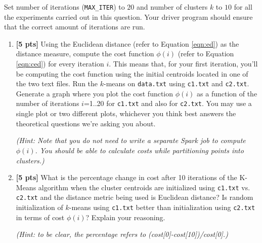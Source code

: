 Set number of iterations (\texttt{MAX\_ITER}) to $20$ and number of clusters
$k$ to $10$ for all the experiments carried out in this question. Your driver
program should ensure that the correct amount of iterations are run.


\begin{enumerate}
\item \textbf{[5 pts] } 
Using the Euclidean distance (refer to Equation \ref{eqn:ed}) as the distance measure, compute the cost function $\phi(i)$ (refer to Equation \ref{eqn:ced}) for every iteration $i$. This means that, for your first iteration, you'll be computing the cost function using the initial centroids located in one of the two text files. Run the $k$-means on \texttt{data.txt} using \texttt{c1.txt} and \texttt{c2.txt}. Generate a graph where you plot the cost function $\phi(i)$ as a function of the number of iterations $i$=1..20 for \texttt{c1.txt} and also for \texttt{c2.txt}. You may use a single plot or two different plots, whichever you think best answers the theoretical questions we’re asking you about.

\textit{(Hint: Note that you do not need to write a separate Spark job to compute $\phi(i)$. You should be able to calculate costs while partitioning points into clusters.)}

\item \textbf{[5 pts] } What is the percentage change in cost after 10 iterations of the K-Means algorithm when the cluster centroids are initialized using \texttt{c1.txt} vs. \texttt{c2.txt} and the distance metric being used is Euclidean distance? Is random initialization of
$k$-means using \texttt{c1.txt} better than initialization using \texttt{c2.txt}
in terms of cost $\phi(i)$? Explain your reasoning.

\textit{(Hint: to be clear, the percentage refers to (cost[0]-cost[10])/cost[0].)}

\end{enumerate}

